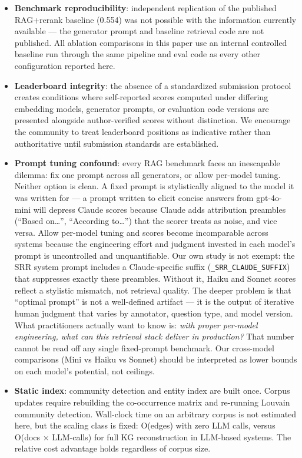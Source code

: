\begin{itemize}
\item
  \textbf{Benchmark reproducibility}: independent replication of the published RAG+rerank baseline (0.554) was not possible with the information currently available --- the generator prompt and baseline retrieval code are not published. All ablation comparisons in this paper use an internal controlled baseline run through the same pipeline and eval code as every other configuration reported here.
\item
  \textbf{Leaderboard integrity}: the absence of a standardized submission protocol creates conditions where self-reported scores computed under differing embedding models, generator prompts, or evaluation code versions are presented alongside author-verified scores without distinction. We encourage the community to treat leaderboard positions as indicative rather than authoritative until submission standards are established.
\item
  \textbf{Prompt tuning confound}: every RAG benchmark faces an inescapable dilemma: fix one prompt across all generators, or allow per-model tuning. Neither option is clean. A fixed prompt is stylistically aligned to the model it was written for --- a prompt written to elicit concise answers from gpt-4o-mini will depress Claude scores because Claude adds attribution preambles (``Based on\ldots{}'', ``According to\ldots{}'') that the scorer treats as noise, and vice versa. Allow per-model tuning and scores become incomparable across systems because the engineering effort and judgment invested in each model's prompt is uncontrolled and unquantifiable. Our own study is not exempt: the SRR system prompt includes a Claude-specific suffix (\texttt{\_SRR\_CLAUDE\_SUFFIX}) that suppresses exactly these preambles. Without it, Haiku and Sonnet scores reflect a stylistic mismatch, not retrieval quality. The deeper problem is that ``optimal prompt'' is not a well-defined artifact --- it is the output of iterative human judgment that varies by annotator, question type, and model version. What practitioners actually want to know is: \emph{with proper per-model engineering, what can this retrieval stack deliver in production?} That number cannot be read off any single fixed-prompt benchmark. Our cross-model comparisons (Mini vs Haiku vs Sonnet) should be interpreted as lower bounds on each model's potential, not ceilings.
\item
  \textbf{Static index}: community detection and entity index are built once. Corpus updates require rebuilding the co-occurrence matrix and re-running Louvain community detection. Wall-clock time on an arbitrary corpus is not estimated here, but the scaling class is fixed: O(edges) with zero LLM calls, versus O(docs × LLM-calls) for full KG reconstruction in LLM-based systems. The relative cost advantage holds regardless of corpus size.

\end{itemize}

